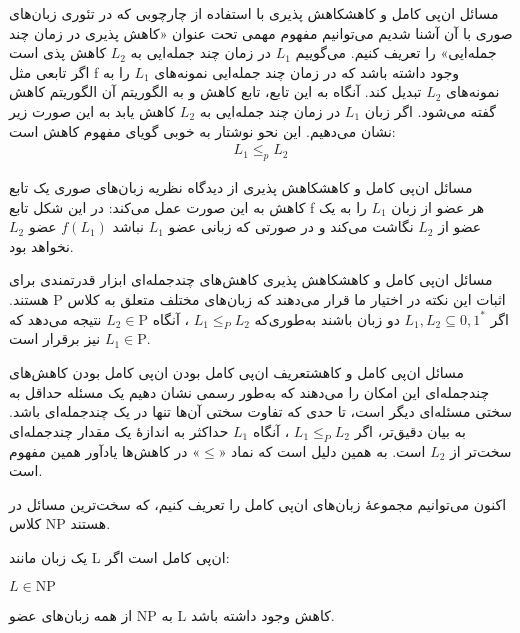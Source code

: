 \begin{itemframe-s}{مسائل ان‌پی کامل و کاهش}{کاهش پذیری}
\itm
با استفاده از چارچوبی که در تئوری زبان‌های صوری با آن آشنا شدیم می‌توانیم مفهوم مهمی تحت عنوان «کاهش پذیری در زمان چند جمله‌ایی»
را تعریف کنیم.
\itm
می‌گوییم $ L_1 $ در زمان چند جمله‌ایی به $ L_2 $  کاهش پذی است  اگر تابعی مثل f وجود داشته باشد که در زمان چند جمله‌ایی نمونه‌های $ L_1 $ را به نمونه‌های $ L_2 $ تبدیل کند. آنگاه به این تابع، تابع کاهش
و به الگوریتم آن الگوریتم کاهش
گفته می‌شود.
\itm
اگر زبان $ L_1 $ در زمان چند جمله‌ایی به $ L_2 $ کاهش یابد به این صورت زیر نشان می‌دهیم. این نحو نوشتار به خوبی گویای مفهوم کاهش است:
\begin{align*}
L_1 \leq_p L_2
\end{align*}
\end{itemframe-s}

\begin{itemframe-s}{مسائل ان‌پی کامل و کاهش}{کاهش پذیری}
\itm
از دیدگاه نظریه زبان‌های صوری یک تابع کاهش به این صورت عمل می‌کند:
 \itm
در این شکل تابع f هر عضو از زبان  $ L_1 $ را به یک عضو از $ L_2 $ نگاشت می‌کند و در صورتی که زبانی عضو  $ L_1 $  نباشد $ f(L_1)$ عضو $ L_2 $ نخواهد بود.

\end{itemframe-s}

\begin{itemframe-s}{مسائل ان‌پی کامل و کاهش}{کاهش پذیری}
\itm
کاهش‌های چندجمله‌ای ابزار قدرتمندی برای اثبات این نکته در اختیار ما قرار می‌دهند که زبان‌های مختلف متعلق به کلاس
 $\mathrm{P}$
هستند.
\itm
اگر
$L_1, L_2 \subseteq {0,1}^*$
دو زبان باشند به‌طوری‌که
$L_1 \leq_P L_2$
، آنگاه
$L_2 \in \mathrm{P}$
 نتیجه می‌دهد که
$L_1 \in \mathrm{P}$
نیز برقرار است.

\end{itemframe-s}

\begin{itemframe-s}{مسائل ان‌پی کامل و کاهش}{تعریف ان‌پی کامل بودن}
\itm
ان‌پی کامل بودن کاهش‌های چندجمله‌ای این امکان را می‌دهند که به‌طور رسمی نشان دهیم یک مسئله حداقل به سختی مسئله‌ای دیگر است، تا حدی که تفاوت سختی آن‌ها تنها در یک چندجمله‌ای باشد.
\itm
 به بیان دقیق‌تر، اگر
 $L_1 \leq_P L_2$
، آنگاه
$L_1$
 حداکثر به اندازهٔ یک مقدار چندجمله‌ای سخت‌تر از
$L_2$
 است. به همین دلیل است که نماد «$\leq$» در کاهش‌ها یادآور همین مفهوم است.

\itm

اکنون می‌توانیم مجموعهٔ زبان‌های ان‌پی کامل را تعریف کنیم، که سخت‌ترین مسائل در کلاس NP هستند.

یک زبان مانند L ان‌پی کامل است اگر:
\item[1]
$L \in \mathrm{NP}$
\item[2]
از همه زبان‌های عضو NP  به L کاهش وجود داشته باشد.

\end{itemframe-s}


